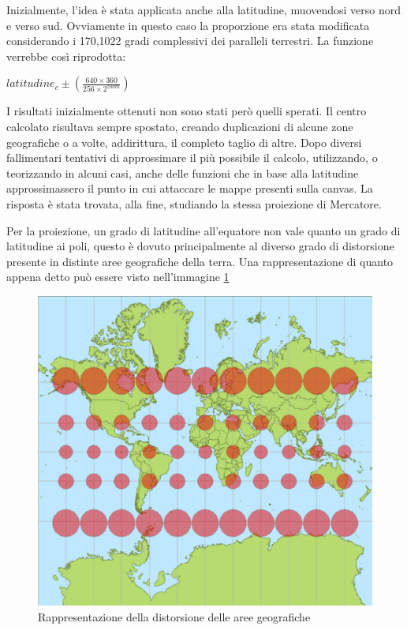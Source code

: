 Inizialmente, l'idea è stata applicata anche alla latitudine, muovendosi verso nord e verso sud. Ovviamente in questo caso la proporzione era stata modificata considerando i 170,1022 gradi complessivi dei paralleli terrestri. La funzione verrebbe così riprodotta:
\begin{center}

	\large$  latitudine_{c} \pm (\frac{640\times360}{256\times2^{zoom}}) $\par

\end{center}

I risultati inizialmente ottenuti non sono stati però quelli sperati. Il centro calcolato risultava sempre spostato, creando duplicazioni di alcune zone geografiche o a volte, addirittura, il completo taglio di altre. Dopo diversi fallimentari tentativi di approssimare il più possibile il calcolo, utilizzando, o teorizzando in alcuni casi, anche delle funzioni che in base alla latitudine approssimassero il punto in cui attaccare le mappe presenti sulla canvas. La risposta è stata trovata, alla fine, studiando la stessa proiezione di Mercatore.

Per la proiezione, un grado di latitudine all'equatore non vale quanto un grado di latitudine ai poli, questo è dovuto principalmente al diverso grado di distorsione presente in distinte aree geografiche della terra. Una rappresentazione di quanto appena detto può essere visto nell'immagine \ref{fig:mercatorproj}
\begin{figure}[H]
	\centering
	\includegraphics[scale=0.5]{figure/mercatorproj.eps}
	\caption{Rappresentazione della distorsione delle aree geografiche}\label{fig:mercatorproj}
\end{figure}

